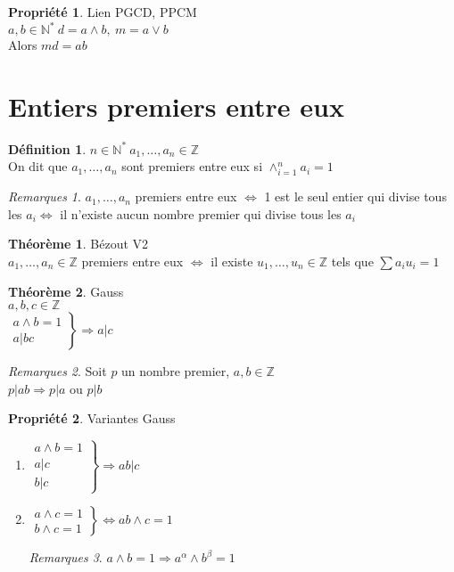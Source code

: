 \documentclass[fleqn]{article}
\theoremstyle{definition} \newtheorem*{defi}{D\'efinition}
\theoremstyle{definition} \newtheorem*{theo}{Th\'eor\`eme}
\theoremstyle{definition} \newtheorem*{coro}{Corollaire}
\theoremstyle{remark} \newtheorem*{rqs}{Remarques}
\theoremstyle{definition} \newtheorem*{prop}{Propri\'et\'e}
\begin{document}
\begin{prop} Lien PGCD, PPCM \\
	$a, b \in \mathbb{N}^*\ d = a \land b,\ m = a \lor b$ \\
	Alors $md = ab$
\end{prop}

\section{Entiers premiers entre eux}
\begin{defi}
	$n \in \mathbb{N}^*\ a_1, \hdots, a_n \in \mathbb{Z}$ \\
	On dit que $a_1, \hdots, a_n$ sont premiers entre eux si $\land_{i=1}^n a_i = 1$

	\begin{rqs}
		$a_1, \hdots, a_n$ premiers entre eux $\Leftrightarrow$ 1 est le seul entier qui divise tous les $a_i \Leftrightarrow$ il n'existe aucun
		nombre premier qui divise tous les $a_i$
	\end{rqs}
\end{defi}

\begin{theo} B\'ezout V2 \\
	$a_1, \hdots, a_n \in \mathbb{Z}$ premiers entre eux $\Leftrightarrow$ il existe $u_1, \hdots, u_n \in \mathbb{Z}$ tels que
	$\sum a_i u_i = 1$
\end{theo}

\begin{theo} Gauss \\
	$a,b,c \in \mathbb{Z}$ \\
	$\left. \begin{array}{l}
		a \land b = 1 \\
		a | bc
	\end{array}\right\} \Rightarrow a | c$

	\begin{rqs}
		Soit $p$ un nombre premier, $a,b \in \mathbb{Z}$ \\
		$p | ab \Rightarrow p|a$ ou $p|b$
	\end{rqs}
\end{theo}

\begin{prop} Variantes Gauss
	\begin{enumerate}
		\item
			$\left. \begin{array}{l}
				a \land b = 1 \\
				a | c \\
				b | c
			\end{array}\right\} \Rightarrow ab | c$
		\item
			$\left. \begin{array}{l}
				a \land c = 1 \\
				b \land c = 1
			\end{array}\right\} \Leftrightarrow ab \land c = 1$
			\begin{rqs}
				$a\land b = 1 \Rightarrow a^{\alpha} \land b^{\beta} = 1$
			\end{rqs}
	\end{enumerate}
\end{prop}
\end{document}
